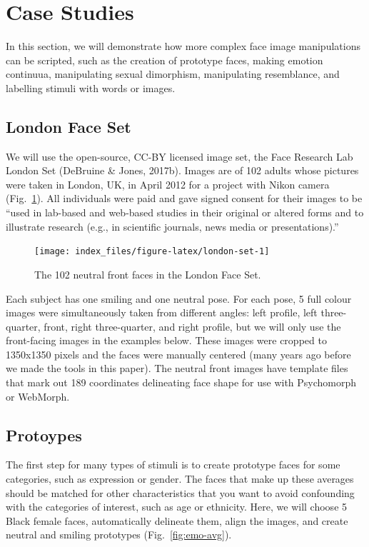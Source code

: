 \documentclass[
  doc,floatsintext]{apa6}
\begin{document}
\hypertarget{case-studies}{%
\section{Case Studies}\label{case-studies}}

In this section, we will demonstrate how more complex face image manipulations can be scripted, such as the creation of prototype faces, making emotion continuua, manipulating sexual dimorphism, manipulating resemblance, and labelling stimuli with words or images.

\hypertarget{london-face-set}{%
\subsection{London Face Set}\label{london-face-set}}

We will use the open-source, CC-BY licensed image set, the Face Research Lab London Set (DeBruine \& Jones, 2017b). Images are of 102 adults whose pictures were taken in London, UK, in April 2012 for a project with Nikon camera (Fig.~\ref{fig:london-set}). All individuals were paid and gave signed consent for their images to be ``used in lab-based and web-based studies in their original or altered forms and to illustrate research (e.g., in scientific journals, news media or presentations).''

\begin{figure}
\texttt{[image: index\_files/figure-latex/london-set-1]} \caption{The 102 neutral front faces in the London Face Set.}\label{fig:london-set}
\end{figure}

Each subject has one smiling and one neutral pose. For each pose, 5 full colour images were simultaneously taken from different angles: left profile, left three-quarter, front, right three-quarter, and right profile, but we will only use the front-facing images in the examples below. These images were cropped to 1350x1350 pixels and the faces were manually centered (many years ago before we made the tools in this paper). The neutral front images have template files that mark out 189 coordinates delineating face shape for use with Psychomorph or WebMorph.

\hypertarget{protoypes}{%
\subsection{Protoypes}\label{protoypes}}

The first step for many types of stimuli is to create prototype faces for some categories, such as expression or gender. The faces that make up these averages should be matched for other characteristics that you want to avoid confounding with the categories of interest, such as age or ethnicity. Here, we will choose 5 Black female faces, automatically delineate them, align the images, and create neutral and smiling prototypes (Fig.~\ref{fig:emo-avg}).
\end{document}
